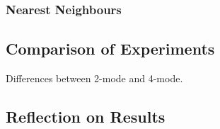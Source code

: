 \documentclass[a4paper, titlepage]{article}
\begin{document}
\subsubsection{Nearest Neighbours}

\subsection{Comparison of Experiments}

Differences between 2-mode and 4-mode.

\subsection{Reflection on Results}

\newpage

\setlength{\bibhang}{0pt}




\end{document}
